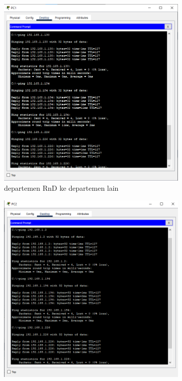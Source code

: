 \begin{figure}[H]
    \centering
    \begin{subfigure}[b]{0.3\linewidth}
      \centering
      \includegraphics[width=\linewidth]{image/uji ping.png}
      \caption{departemen RnD ke departemen lain}
    \end{subfigure}
    \hspace{1cm}
    \begin{subfigure}[b]{0.3\linewidth}
      \centering
      \includegraphics[width=\linewidth]{image/uji ping1.png}

\end{subfigure}
\end{figure}
